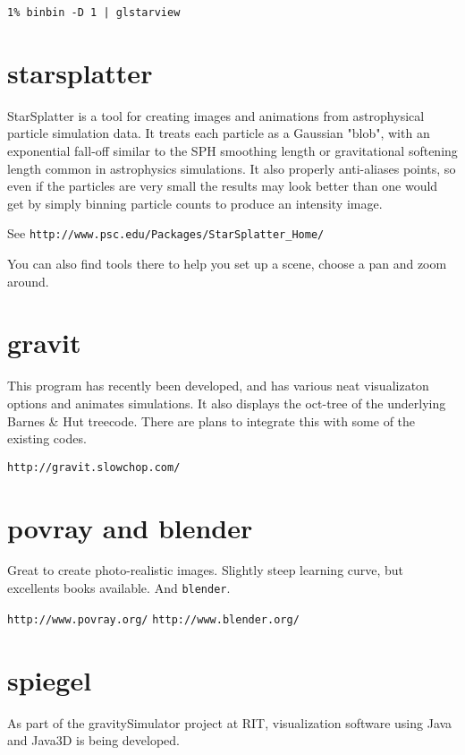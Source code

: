 \begin{itemize}
\begin{itemize}
\footnotesize\begin{verbatim}
1% binbin -D 1 | glstarview
\end{verbatim}\normalsize


\section{starsplatter}

StarSplatter is a tool for creating images and animations from
astrophysical particle simulation data. It treats each particle as a
Gaussian "blob", with an exponential fall-off similar to the SPH
smoothing length or gravitational softening length common in
astrophysics simulations. It also properly anti-aliases points, so
even if the particles are very small the results may look better than
one would get by simply binning particle counts to produce an
intensity image.

See {\tt http://www.psc.edu/Packages/StarSplatter\_Home/}

You can also find tools there to help you set up a scene, choose a pan and
zoom around.

\section{gravit}

This program has recently been developed, and has various neat visualizaton
options and animates simulations. It also displays the oct-tree of the
underlying Barnes \& Hut treecode. There are plans to integrate this with
some of the existing codes.

{\tt http://gravit.slowchop.com/}

\section{povray and blender}

Great to create photo-realistic images. Slightly steep learning curve, but
excellents books available. And {\tt blender}.

{\tt http://www.povray.org/}
{\tt http://www.blender.org/}

\section{spiegel}

As part of the gravitySimulator project at RIT, visualization software using Java
and Java3D is being developed.


\end{itemize}
\end{itemize}
